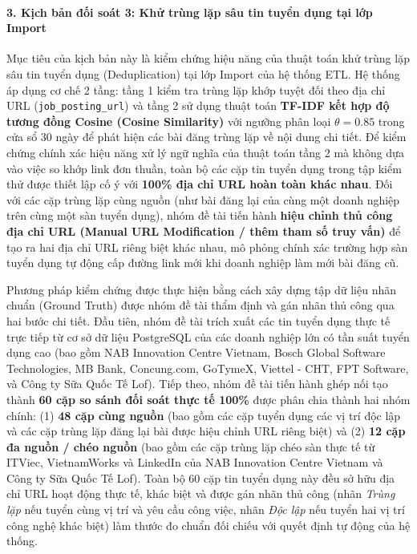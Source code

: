 \paragraph*{3. Kịch bản đối soát 3: Khử trùng lặp sâu tin tuyển dụng tại lớp Import}
Mục tiêu của kịch bản này là kiểm chứng hiệu năng của thuật toán khử trùng lặp sâu tin tuyển dụng (Deduplication) tại lớp Import của hệ thống ETL. Hệ thống áp dụng cơ chế 2 tầng: tầng 1 kiểm tra trùng lặp khớp tuyệt đối theo địa chỉ URL (\texttt{job\_posting\_url}) và tầng 2 sử dụng thuật toán \textbf{TF-IDF kết hợp độ tương đồng Cosine (Cosine Similarity)} với ngưỡng phân loại $\theta = 0.85$ trong cửa sổ 30 ngày để phát hiện các bài đăng trùng lặp về nội dung chi tiết. Để kiểm chứng chính xác hiệu năng xử lý ngữ nghĩa của thuật toán tầng 2 mà không dựa vào việc so khớp link đơn thuần, toàn bộ các cặp tin tuyển dụng trong tập kiểm thử được thiết lập cố ý với \textbf{100\% địa chỉ URL hoàn toàn khác nhau}. Đối với các cặp trùng lặp cùng nguồn (như bài đăng lại của cùng một doanh nghiệp trên cùng một sàn tuyển dụng), nhóm đề tài tiến hành \textbf{hiệu chỉnh thủ công địa chỉ URL (Manual URL Modification / thêm tham số truy vấn)} để tạo ra hai địa chỉ URL riêng biệt khác nhau, mô phỏng chính xác trường hợp sàn tuyển dụng tự động cấp đường link mới khi doanh nghiệp làm mới bài đăng cũ.

Phương pháp kiểm chứng được thực hiện bằng cách xây dựng tập dữ liệu nhãn chuẩn (Ground Truth) được nhóm đề tài thẩm định và gán nhãn thủ công qua hai bước chi tiết. Đầu tiên, nhóm đề tài trích xuất các tin tuyển dụng thực tế trực tiếp từ cơ sở dữ liệu PostgreSQL của các doanh nghiệp lớn có tần suất tuyển dụng cao (bao gồm NAB Innovation Centre Vietnam, Bosch Global Software Technologies, MB Bank, Concung.com, GoTymeX, Viettel - CHT, FPT Software, và Công ty Sữa Quốc Tế Lof). Tiếp theo, nhóm đề tài tiến hành ghép nối tạo thành \textbf{60 cặp so sánh đối soát thực tế 100\%} được phân chia thành hai nhóm chính: (1) \textbf{48 cặp cùng nguồn} (bao gồm các cặp tuyển dụng các vị trí độc lập và các cặp trùng lặp đăng lại bài được hiệu chỉnh URL riêng biệt) và (2) \textbf{12 cặp đa nguồn / chéo nguồn} (bao gồm các cặp trùng lặp chéo sàn thực tế từ ITViec, VietnamWorks và LinkedIn của NAB Innovation Centre Vietnam và Công ty Sữa Quốc Tế Lof). Toàn bộ 60 cặp tin tuyển dụng này đều sở hữu địa chỉ URL hoạt động thực tế, khác biệt và được gán nhãn thủ công (nhãn \textit{Trùng lặp} nếu tuyển cùng vị trí và yêu cầu công việc, nhãn \textit{Độc lập} nếu tuyển hai vị trí công nghệ khác biệt) làm thước đo chuẩn đối chiếu với quyết định tự động của hệ thống.

